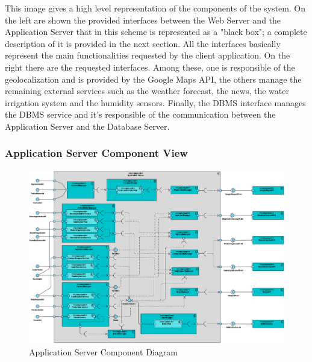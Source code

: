\documentclass[table, 12pt]{article}
\begin{document}
This image gives a high level representation of the components of the system.
On the left are shown the provided interfaces between the Web Server and the Application Server that in this scheme is represented as a "black box"; a complete description of it is provided in the next section.
All the interfaces basically represent the main functionalities requested by the client application.
On the right there are the requested interfaces. Among these, one is responsible of the geolocalization and is provided by the Google Maps API, the others manage the remaining external services such as the weather forecast, the news, the water irrigation system and the humidity sensors.
Finally, the DBMS interface manages the DBMS service and it's responsible of the communication between the Application Server and the Database Server.

\subsubsection*{Application Server Component View}
\begin{center}
    \begin{figure}[H]
        \includegraphics[scale=0.45, center]{assets/application-server-component.png}
        \caption{Application Server Component Diagram}
        \label{fig: application_server_component_view}
    \end{figure}
\end{center}
\end{document}
